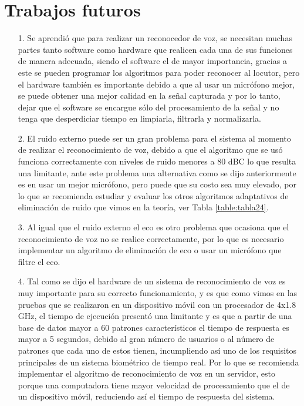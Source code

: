\section{Trabajos futuros}
\begin{enumerate}
\item[1.]Se aprendió que para realizar un reconocedor de voz, se necesitan muchas partes tanto software como hardware que realicen cada una de sus funciones de manera adecuada, siendo el software el de mayor importancia, gracias a este se pueden programar los algoritmos para poder reconocer al locutor, pero el hardware también es importante debido a que al usar un micrófono mejor, se puede obtener una mejor calidad en la señal capturada y por lo tanto, dejar que el software se encargue sólo del procesamiento de la señal y no tenga que desperdiciar tiempo en limpiarla, filtrarla y normalizarla.

\item[2.]El ruido externo puede ser un gran problema para el sistema al momento de realizar el reconocimiento de voz, debido a que el algoritmo que se usó funciona correctamente con niveles de ruido menores a 80 dBC lo que resulta una limitante, ante este problema una alternativa como se dijo anteriormente es en usar un mejor micrófono, pero puede que su costo sea muy elevado, por lo que se recomienda estudiar y evaluar los otros algoritmos adaptativos de eliminación de ruido que vimos en la teoría, ver Tabla \ref{table:tabla24}.

\item[3.]Al igual que el ruido externo el eco es otro problema que ocasiona que el reconocimiento de voz no se realice correctamente, por lo que es necesario implementar un algoritmo de eliminación de eco o usar un micrófono que filtre el eco.

\item[4.]Tal como se dijo el hardware de un sistema de reconocimiento de voz es muy importante para su correcto funcionamiento, y es que como vimos en las pruebas que se realizaron en un dispositivo móvil con un procesador de 4x1.8 GHz, el tiempo de ejecución presentó una limitante y es que a partir de una base de datos mayor a 60 patrones característicos el tiempo de respuesta es mayor a 5 segundos, debido al gran número de usuarios o al número de patrones que cada uno de estos tienen, incumpliendo así uno de los requisitos principales de un sistema biométrico de tiempo real. Por lo que se recomienda implementar el algoritmo de reconocimiento de voz en un servidor, esto porque una computadora tiene mayor velocidad de procesamiento que el de un dispositivo móvil, reduciendo así el tiempo de respuesta del sistema.


\end{enumerate}
